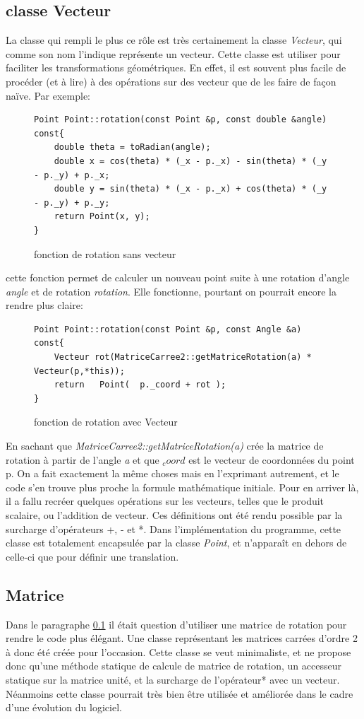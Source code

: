 \documentclass[10pt,a4paper]{report}
\begin{document}
\begin{spacing}{0.8}
\subsection{classe Vecteur}\label{vecteur}
La classe qui rempli le plus ce rôle est très certainement la classe \textit{Vecteur}, qui comme son nom l'indique représente un vecteur.
Cette classe est utiliser pour faciliter les transformations géométriques. En effet, il est souvent plus facile de procéder (et à lire) à  des opérations sur des vecteur que de les faire de façon naïve. Par exemple:
\begin{figure}[H]
\begin{verbatim}
Point Point::rotation(const Point &p, const double &angle) const{
	double theta = toRadian(angle);
	double x = cos(theta) * (_x - p._x) - sin(theta) * (_y - p._y) + p._x;
	double y = sin(theta) * (_x - p._x) + cos(theta) * (_y - p._y) + p._y;
	return Point(x, y);
}
\end{verbatim}
\caption{fonction de rotation sans vecteur}
\end{figure}
cette fonction permet de calculer un nouveau point suite à une rotation
d'angle \textit{angle} et de rotation \textit{rotation}. Elle fonctionne, pourtant on pourrait encore la rendre plus claire:
\begin{figure}[H]
\begin{verbatim}
Point Point::rotation(const Point &p, const Angle &a) const{
    Vecteur rot(MatriceCarree2::getMatriceRotation(a) * Vecteur(p,*this));
    return   Point(  p._coord + rot );
}
\end{verbatim}
\caption{fonction de rotation avec Vecteur}
\end{figure}
En sachant que \textit{MatriceCarree2::getMatriceRotation(a)} crée la matrice de rotation à partir de l'angle \textit{a} et que \textit{$_coord$} est le vecteur de coordonnées du point p.
On a fait exactement la même choses mais en l'exprimant autrement, et le code s'en trouve plus proche la formule mathématique initiale.
Pour en arriver là, il a fallu recréer quelques opérations sur les vecteurs, telles que le produit scalaire, ou l'addition de vecteur. Ces définitions ont été rendu possible par la surcharge d'opérateurs +, - et *.
Dans l'implémentation du programme, cette classe est totalement encapsulée par la classe \textit{Point}, et n'apparaît en dehors de celle-ci que pour définir une translation.

\subsection{Matrice}
Dans le paragraphe \ref{vecteur} il était question d'utiliser une matrice de rotation pour rendre le code plus élégant.
Une classe représentant les matrices carrées d'ordre 2 à donc été créée pour l'occasion.
Cette classe se veut minimaliste, et ne propose donc qu'une méthode statique de calcule de matrice de rotation, un accesseur statique sur la matrice unité, et la surcharge de l'opérateur* avec un vecteur.
Néanmoins cette classe pourrait très bien être utilisée et améliorée dans le cadre d'une évolution du logiciel.


\end{spacing}
\end{document}
